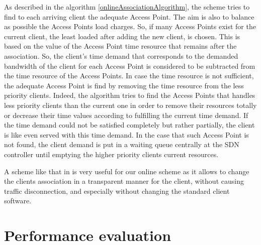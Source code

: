 \documentclass[journal,transmag]{IEEEtran}
\begin{document}
As described in the algorithm \ref{onlineAssociationAlgorithm}, the scheme tries to find to each arriving client the adequate Access Point. The aim is also to balance as possible the Access Points load charges. So, if many Access Points exist for the current client, the least loaded after adding the new client, is chosen. This is based on the value of the Access Point time resource that remains after the association. So, the client's time demand that corresponds to the demanded bandwidth of the client for each Access Point is considered to be subtracted from the time resource of the Access Points. In case the time resource is not sufficient, the adequate Access Point is find by removing the time resource from the less priority clients. Indeed, the algorithm tries to find the Access Points that handles less priority clients than the current one in order to remove their resources totally or decrease their time values according to fulfilling the current time demand. If the time demand could not be satisfied completely but rather partially, the client is like even served with this time demand. In the case that such Access Point is not found, the client demand is put in a waiting queue centrally at the SDN controller until emptying the higher priority clients current resources.  

A scheme like that in \cite{14Odin:Programmatic_Orchestration_WiFi} is very useful for our online scheme as it allows to change the clients association in a transparent manner for the client, without causing traffic disconnection, and especially without changing the standard client software. 



\section{Performance evaluation}
\label{performance evaluation}
\end{document}
